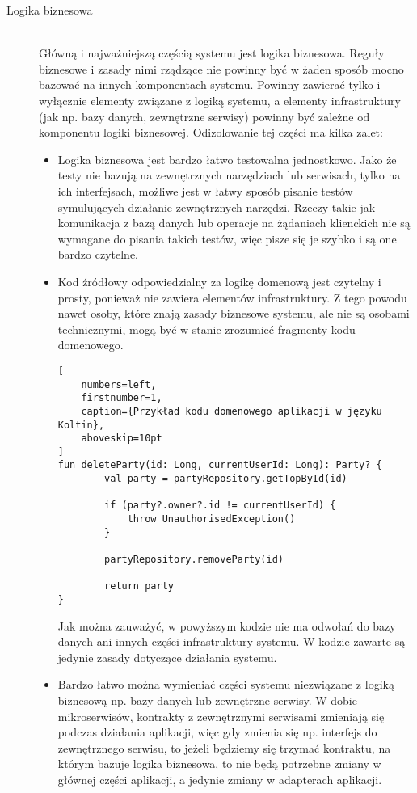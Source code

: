 \begin{description}
  \item[Logika biznesowa] \hfill \\ Główną i najważniejszą częścią systemu jest logika biznesowa. Reguły biznesowe i zasady nimi rządzące nie powinny być w żaden sposób mocno bazować na innych komponentach systemu. Powinny zawierać tylko i wyłącznie elementy związane z logiką systemu, a elementy infrastruktury (jak np. bazy danych, zewnętrzne serwisy) powinny być zależne od komponentu logiki biznesowej. Odizolowanie tej części ma kilka zalet:
\begin{itemize}
  \item Logika biznesowa jest bardzo łatwo testowalna jednostkowo. Jako że testy nie bazują na zewnętrznych narzędziach lub serwisach, tylko na ich interfejsach, możliwe jest w łatwy sposób pisanie testów symulujących działanie zewnętrznych narzędzi. Rzeczy takie jak komunikacja z bazą danych lub operacje na żądaniach klienckich nie są wymagane do pisania takich testów, więc pisze się je szybko i są one bardzo czytelne.
  \item Kod źródłowy odpowiedzialny za logikę domenową jest czytelny i prosty, ponieważ nie zawiera elementów infrastruktury. Z tego powodu nawet osoby, które znają zasady biznesowe systemu, ale nie są osobami technicznymi, mogą być w stanie zrozumieć fragmenty kodu domenowego.
\begin{addmargin}[6mm]{0mm}
\begin{lstlisting}[
    numbers=left,
    firstnumber=1,
    caption={Przykład kodu domenowego aplikacji w języku Koltin},
    aboveskip=10pt
]
fun deleteParty(id: Long, currentUserId: Long): Party? {
        val party = partyRepository.getTopById(id)

        if (party?.owner?.id != currentUserId) {
            throw UnauthorisedException()
        }

        partyRepository.removeParty(id)

        return party
}
\end{lstlisting}
\end{addmargin}
  Jak można zauważyć, w powyższym kodzie nie ma odwołań do bazy danych ani innych części infrastruktury systemu. W kodzie zawarte są jedynie zasady dotyczące działania systemu.%
  \item Bardzo łatwo można wymieniać części systemu niezwiązane z logiką biznesową np. bazy danych lub zewnętrzne serwisy. W dobie mikroserwisów, kontrakty z zewnętrznymi serwisami zmieniają się podczas działania aplikacji, więc gdy zmienia się np. interfejs do zewnętrznego serwisu, to jeżeli będziemy się trzymać kontraktu, na którym bazuje logika biznesowa, to nie będą potrzebne zmiany w głównej części aplikacji, a jedynie zmiany w adapterach aplikacji.
\end{itemize}


\end{description}
